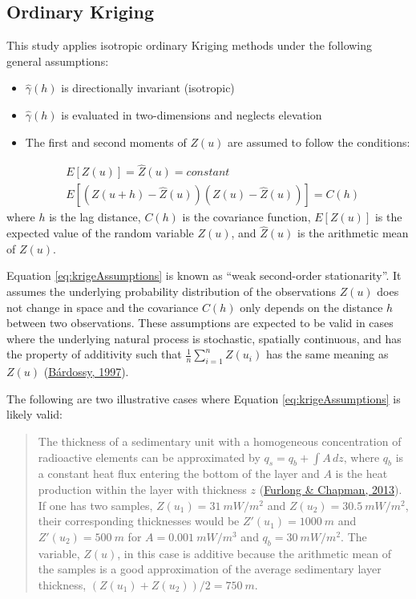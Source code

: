 \hypertarget{ordinary-kriging}{%
\subsection{Ordinary Kriging}\label{ordinary-kriging}}

This study applies isotropic ordinary Kriging methods under the following general assumptions:

\begin{itemize}
\tightlist
\item
  \(\hat{\gamma}(h)\) is directionally invariant (isotropic)
\item
  \(\hat{\gamma}(h)\) is evaluated in two-dimensions and neglects elevation
\item
  The first and second moments of \(Z(u)\) are assumed to follow the conditions:
\end{itemize}

\begin{equation}
  \begin{aligned}
    &E[Z(u)] = \hat{Z}(u) = constant \\
    &E[(Z(u + h) - \hat{Z}(u))(Z(u) - \hat{Z}(u))] = C(h)
  \end{aligned}
  \label{eq:krigeAssumptions}
\end{equation}
where \(h\) is the lag distance, \(C(h)\) is the covariance function, \(E[Z(u)]\) is the expected value of the random variable \(Z(u)\), and \(\hat{Z}(u)\) is the arithmetic mean of \(Z(u)\).

Equation \eqref{eq:krigeAssumptions} is known as ``weak second-order stationarity''. It assumes the underlying probability distribution of the observations \(Z(u)\) does not change in space and the covariance \(C(h)\) only depends on the distance \(h\) between two observations. These assumptions are expected to be valid in cases where the underlying natural process is stochastic, spatially continuous, and has the property of additivity such that \(\frac{1}{n}\sum_{i=1}^n Z(u_i)\) has the same meaning as \(Z(u)\) (\protect\hyperlink{ref-bardossy1997}{Bárdossy, 1997}).

The following are two illustrative cases where Equation \eqref{eq:krigeAssumptions} is likely valid:

\begin{quote}
The thickness of a sedimentary unit with a homogeneous concentration of radioactive elements can be approximated by \(q_s = q_b + \int A \,dz\), where \(q_b\) is a constant heat flux entering the bottom of the layer and \(A\) is the heat production within the layer with thickness \(z\) (\protect\hyperlink{ref-furlong2013}{Furlong \& Chapman, 2013}). If one has two samples, \(Z(u_1) = 31~mW/m^2\) and \(Z(u_2) = 30.5~mW/m^2\), their corresponding thicknesses would be \(Z'(u_1) = 1000~m\) and \(Z'(u_2) = 500~m\) for \(A = 0.001~mW/m^3\) and \(q_b = 30~mW/m^2\). The variable, \(Z(u)\), in this case is additive because the arithmetic mean of the samples is a good approximation of the average sedimentary layer thickness, \((Z(u_1) + Z(u_2)) / 2 = 750~m\).
\end{quote}


